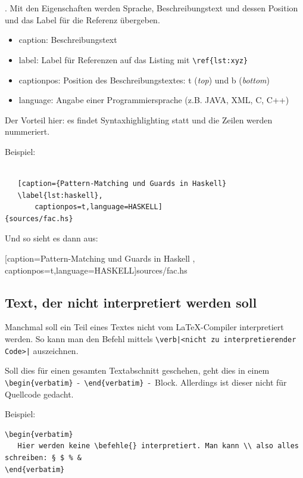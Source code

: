 \documentclass[
	10pt,
	parskip=half-,		%
	paper=a4,			%
	english, ngerman		%
	]{scrartcl}			%
\begin{document}
\verb||. Mit den Eigenschaften werden Sprache, Beschreibungstext und dessen Position und das Label für die Referenz übergeben.
\begin{itemize}
	\item caption: Beschreibungstext
	\item label: Label für Referenzen auf das Listing mit \verb|\ref{lst:xyz}|
	\item captionpos: Position des Beschreibungstextes: t (\emph{top}) und b (\emph{bottom})
	\item language: Angabe einer Programmiersprache (z.B. JAVA, XML, C, C++)
\end{itemize}
Der Vorteil hier: es findet Syntaxhighlighting statt und die Zeilen werden nummeriert.

Beispiel:
\begin{verbatim}

   [caption={Pattern-Matching und Guards in Haskell}
   \label{lst:haskell},
       captionpos=t,language=HASKELL]
{sources/fac.hs}
\end{verbatim}

Und so sieht es dann aus:

   [caption={Pattern-Matching und Guards in Haskell}
   \label{lst:haskell},
       captionpos=t,language=HASKELL]{sources/fac.hs}


\subsection{Text, der nicht interpretiert werden soll}
Manchmal soll ein Teil eines Textes nicht vom \LaTeX-Compiler interpretiert werden. So kann man den Befehl mittels \verb=\verb|<nicht zu interpretierender Code>|= auszeichnen.

Soll dies für einen gesamten Textabschnitt geschehen, geht dies in einem \verb|\begin{verbatim}|~-~\verb|\end{verbatim}|~-~Block. Allerdings ist dieser nicht für Quellcode gedacht.

Beispiel:

\begin{lstlisting}
\begin{verbatim}
   Hier werden keine \befehle{} interpretiert. Man kann \\ also alles schreiben: § $ % &
\end{verbatim}
\end{lstlisting}


\end{document}
